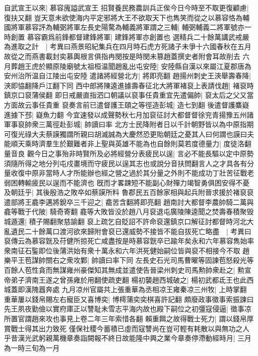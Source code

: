 自武宣王以來|{
	慕容廆謚武宣王}
招賢養民務農訓兵正俟今日今時至不取更復顧慮|{
	復扶又翻}
豈天意未欲使海内平定邪將大王不欲取天下也雋笑而從之以慕容恪為輔國將軍慕容評為輔弼將軍左長史陽騖為輔義將軍謂之三輔|{
	輔弼輔義二將軍號亦一時創置}
慕容霸爲前鋒都督建鋒將軍|{
	建鋒將軍亦創置也}
選精兵二十餘萬講武戒嚴為進取之計　|{
	考異曰燕景昭紀集兵在四月時石虎方死諸子未爭十六國春秋在五月故從之而燕書載封奕慕輿根言俱指冉閔按是時閔未篡趙蓋撰史者附會耳故削去}
六月葬趙王虎於顯原陵廟號太祖桓温聞趙亂出屯安陸|{
	安陸縣自漢以來屬江夏郡唐為安州治所温自江陵出屯安陸}
遣諸將經營北方|{
	將即亮翻}
趙揚州刺史王浹舉壽春降|{
	浹即恊翻降戶江翻下同}
西中郎將陳逵進據壽春征北大將軍褚裒上表請伐趙|{
	褚裒時鎮京口裒蒲侯翻}
即日戒嚴直指泗口朝議以裒事任貴重宜先遣偏帥|{
	裒太后之父又當方面故云事任貴重}
裒奏言前已遣督護王頤之等徑造彭城|{
	造七到翻}
後遣督護麋嶷進據下邳|{
	嶷魚力翻}
今宜速發以成聲勢秋七月加裒征討大都督督徐兖青揚豫五州諸軍事裒帥衆三萬徑赴彭城|{
	帥讀曰率}
北方士民降附者日以千計朝野皆以為中原指期可復光祿大夫蔡謨獨謂所親曰胡滅誠為大慶然恐更貽朝廷之憂其人曰何謂也謨曰夫能順天乘時濟羣生於艱難者非上聖與英雄不能為也自餘則莫若度德量力|{
	度徒洛翻量音良}
觀今日之事殆非時賢所及必將經營分表疲民以逞|{
	言必不能長驅以定中原勢須隨所得之地分列屯戍畫境而守疲民以逞其志也或說分音扶問翻言人之才具各有分量收復中原非當時人才所能辦也經之營之過於其分量之外則不能成功丁壯苦征戰老弱困轉輸疲民以逞而不能濟也}
旣而才畧踈短不能副心財殫力竭智勇俱困安得不憂及朝廷乎|{
	其後殷浩之敗卒如蔡謨所料}
魯郡民五百餘家相與起兵附晉求援於褚裒裒遣部將王龕李邁將銳卒三千迎之|{
	龕苦含翻將即亮翻}
趙南討大都督李農帥騎二萬與龕等戰于代陂|{
	騎奇寄翻}
龕等大敗皆没於趙八月裒退屯廣陵陳逵聞之焚壽春積聚毁城遁還|{
	積子賜翻聚慈諭翻}
裒上疏乞自貶詔不許命裒還鎮京口解征討都督時河北大亂遺民二十餘萬口渡河欲來歸附會裒已還威勢不接皆不能自拔死亡略盡　|{
	考異曰裒傳云為慕容皝及苻健所掠死亡咸盡按是時慕容皝卒已踰年矣永和六年慕容雋始率衆南征石鍳即位後蒲洪始有衆十萬永和六年洪死健始嗣位皆與裒不相接今不取}
趙樂平王苞謀帥關右之衆攻鄴|{
	帥讀曰率下同}
左長史石光司馬曹曜等固諫苞怒殺光等百餘人苞性貪而無謀雍州豪傑知其無成並遣使告晉梁州刺史司馬勲帥衆赴之|{
	勲宣帝弟子濟南王遂之曾孫雍於用翻使疏吏翻}
楊初襲趙西城破之|{
	楊初武都氐王也此西城蓋即漢隗囂奔處}
九月凉州官屬共上張重華為丞相凉王雍秦凉三州牧|{
	上時掌翻}
重華屢以錢帛賜左右寵臣又喜博奕|{
	博樗蒲奕奕棋喜許記翻}
頗廢政事徵事索振諫曰先王夙夜勤儉以實府庫正以讐耻未雪志平海内故也殿下嗣位之初彊寇侵逼|{
	徵事凉所置官謂趙來攻也事見上卷二年三年索惜各翻}
賴重餌之故得戰士死力|{
	謂以錢帛厚賞戰士得其出力致死}
僅保社稷今蓄積已虛而寇讐尚在豈可輕有耗散以與無功之人乎昔漢光武躬親萬機章奏詣闕報不終日故能隆中興之業今章奏停滯動經時月|{
	三月為一時三旬為一月}
